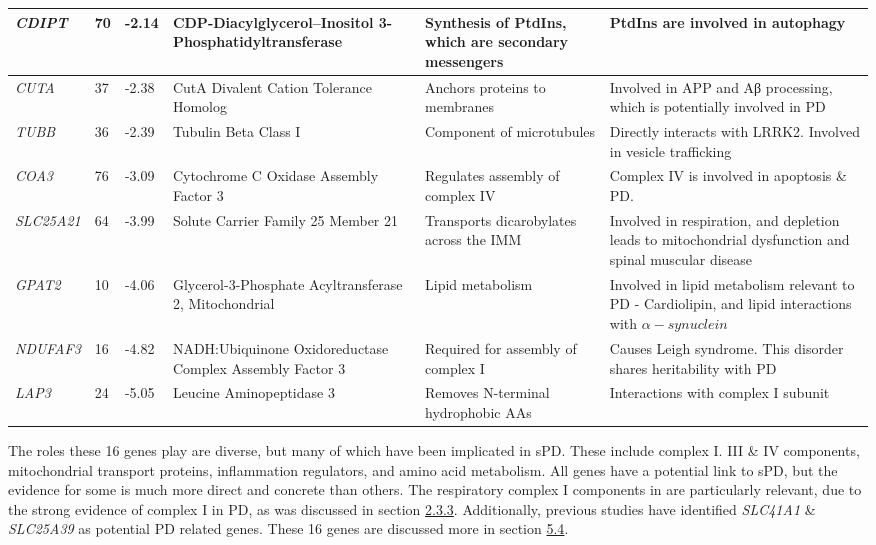 \documentclass{article}
\begin{document}
\begin{landscape}
\begin{table}[]
\begin{tabular}{|p{1.5cm}|p{1cm}|p{1cm}|p{5cm}|p{5cm}|p{8cm}|}
\textit{CDIPT}    & 70    & -2.14 & CDP-Diacylglycerol--Inositol   3-Phosphatidyltransferase     & Synthesis of PtdIns, which are   secondary messengers & PtdIns are involved in autophagy\cite{Zhang2021TargetingDisease} \\ \hline
\textit{CUTA}     & 37    & -2.38 & CutA Divalent Cation Tolerance   Homolog    & Anchors proteins to membranes  & Involved in APP and Aβ processing\cite{Hou2015TheGeneration}, which is potentially involved in PD\cite{Lim2019Amyloid-Disease} \\ \hline
\textit{TUBB}     & 36    & -2.39 & Tubulin Beta Class I  & Component of microtubules & Directly interacts with LRRK2\cite{Law2014AAcetylation}. Involved in vesicle trafficking\cite{Sferra2020TUBBDynamics}  \\ \hline
\textit{COA3}     & 76    & -3.09 & Cytochrome C Oxidase Assembly   Factor 3   & Regulates assembly of complex IV   & Complex IV is involved in apoptosis\cite{Vladimirov2013MolecularComplex} \& PD\cite{Li2021MitochondrialChain}. \\ \hline
\textit{SLC25A21} & 64    & -3.99 & Solute Carrier Family 25 Member   21  & Transports dicarobylates across   the IMM  & Involved in respiration, and   depletion leads to mitochondrial dysfunction and spinal muscular disease\cite{Boczonadi2018MitochondrialDisease} \\ \hline
\textit{GPAT2}    & 10    & -4.06 & Glycerol-3-Phosphate   Acyltransferase 2, Mitochondrial      & Lipid metabolism   & Involved in lipid metabolism relevant to PD - Cardiolipin\cite{Xicoy2019TheDisease.}, and lipid interactions with $\alpha-synuclein$\cite{Fanning2019LipidomicTreatment.}  \\ \hline
\textit{NDUFAF3}  & 16    & -4.82 & NADH:Ubiquinone Oxidoreductase   Complex Assembly Factor 3   & Required for assembly of complex   I   & Causes Leigh syndrome\cite{Baertling2017MutationsSyndrome}. This disorder shares heritability with PD\cite{Wahedi2023TranscriptomicGenes} \\ \hline
\textit{LAP3}     & 24    & -5.05 & Leucine Aminopeptidase 3  & Removes N-terminal hydrophobic AAs & Interactions with complex I subunit\cite{Guarani2014TIMMDC1/C3orf1Complex} \\ \hline
\end{tabular}
\end{table}
\end{landscape}
The roles these 16 genes play are diverse, but many of which have been implicated in  sPD. These include complex I. III \& IV components, mitochondrial transport proteins, inflammation regulators,  and amino acid metabolism. All genes have a potential link to sPD, but the evidence for some is much more direct and concrete than others. The respiratory complex I components in are particularly relevant, due to the strong evidence of complex I in PD, as was discussed in section \hyperref[para:oxidative]{2.3.3}. Additionally, previous studies have identified \textit{SLC41A1} \& \textit{SLC25A39} as potential PD related genes. These 16 genes are discussed more in section \hyperref[subsec:wider]{5.4}.
\end{document}
